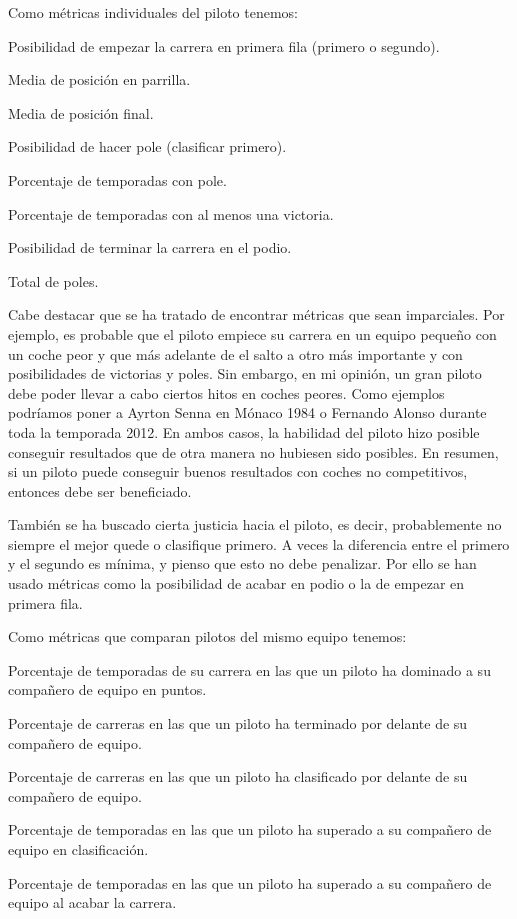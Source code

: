 \documentclass[12pt,twoside,titlepage]{report}
\begin{document}
Como métricas individuales del piloto tenemos:
\begin{compactitem}
	\item Posibilidad de empezar la carrera en primera fila (primero o segundo).
	\item Media de posición en parrilla.
	\item Media de posición final.
	\item Posibilidad de hacer pole (clasificar primero).
	\item Porcentaje de temporadas con pole.
	\item Porcentaje de temporadas con al menos una victoria.
	\item Posibilidad de terminar la carrera en el podio.
	\item Total de poles.
\end{compactitem}

Cabe destacar que se ha tratado de encontrar métricas que sean imparciales. Por ejemplo, es probable que el piloto empiece su carrera en un equipo pequeño con un coche peor y que más adelante de el salto a otro más importante y con posibilidades de victorias y poles. Sin embargo, en mi opinión, un gran piloto debe poder llevar a cabo ciertos hitos en coches peores. Como ejemplos podríamos poner a Ayrton Senna en Mónaco 1984 o Fernando Alonso durante toda la temporada 2012. En ambos casos, la habilidad del piloto hizo posible conseguir resultados que de otra manera no hubiesen sido posibles. En resumen, si un piloto puede conseguir buenos resultados con coches no competitivos, entonces debe ser beneficiado.

También se ha buscado cierta justicia hacia el piloto, es decir, probablemente no siempre el mejor quede o clasifique primero. A veces la diferencia entre el primero y el segundo es mínima, y pienso que esto no debe penalizar. Por ello se han usado métricas como la posibilidad de acabar en podio o la de empezar en primera fila.

Como métricas que comparan pilotos del mismo equipo tenemos:
\begin{compactitem}
	\item Porcentaje de temporadas de su carrera en las que un piloto ha dominado a su compañero de equipo en puntos.
	\item Porcentaje de carreras en las que un piloto ha terminado por delante de su compañero de equipo.
	\item Porcentaje de carreras en las que un piloto ha clasificado por delante de su compañero de equipo.
	\item Porcentaje de temporadas en las que un piloto ha superado a su compañero de equipo en clasificación.
	\item Porcentaje de temporadas en las que un piloto ha superado a su compañero de equipo al acabar la carrera.
\end{compactitem}
\end{document}
